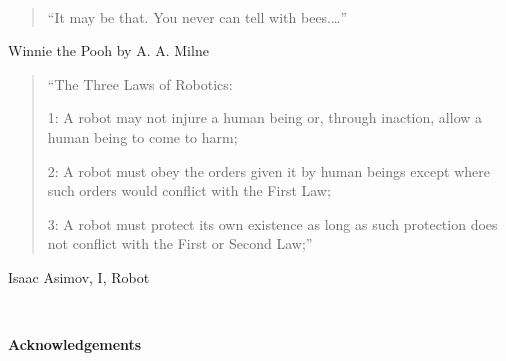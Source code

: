
\newpage

\ 

\begin{quotation}
``It may be that. You never can tell with bees.\ldots''
\end{quotation}
\begin{flushright}
Winnie the Pooh by A. A. Milne
\end{flushright}

\vspace{1cm}

\begin{quotation}
``The Three Laws of Robotics:

1: A robot may not injure a human being or, through inaction, allow a human being to come to harm;

2: A robot must obey the orders given it by human beings except where such orders would conflict with the First Law;

3: A robot must protect its own existence as long as such protection does not conflict with the First or Second Law;''
\end{quotation}
\begin{flushright}
Isaac Asimov, I, Robot
\end{flushright}


\ 


\newpage

\begin{center}{\Large\bf Acknowledgements}\end{center}

\vspace{0.3cm}

